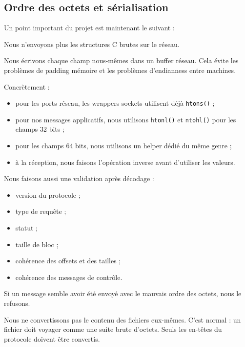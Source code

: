 \documentclass[a4paper,11pt]{article}
\begin{document}
\subsection{Ordre des octets et sérialisation}

Un point important du projet est maintenant le suivant :

\begin{warningbox}
Nous n'envoyons plus les structures C brutes sur le réseau.

Nous écrivons chaque champ nous-mêmes dans un buffer réseau. Cela évite les
problèmes de padding mémoire et les problèmes d'endianness entre machines.
\end{warningbox}

Concrètement :

\begin{itemize}[leftmargin=*]
    \item pour les ports réseau, les wrappers sockets utilisent déjà
    \texttt{htons()} ;
    \item pour nos messages applicatifs, nous utilisons \texttt{htonl()} et
    \texttt{ntohl()} pour les champs 32 bits ;
    \item pour les champs 64 bits, nous utilisons un helper dédié du même genre ;
    \item à la réception, nous faisons l'opération inverse avant d'utiliser les valeurs.
\end{itemize}

Nous faisons aussi une validation après décodage :

\begin{itemize}[leftmargin=*]
    \item version du protocole ;
    \item type de requête ;
    \item statut ;
    \item taille de bloc ;
    \item cohérence des offsets et des tailles ;
    \item cohérence des messages de contrôle.
\end{itemize}

Si un message semble avoir été envoyé avec le mauvais ordre des octets, nous le
refusons.

\begin{infobox}
Nous ne convertissons pas le contenu des fichiers eux-mêmes. C'est normal : un
fichier doit voyager comme une suite brute d'octets. Seuls les en-têtes du
protocole doivent être convertis.
\end{infobox}
\end{document}
